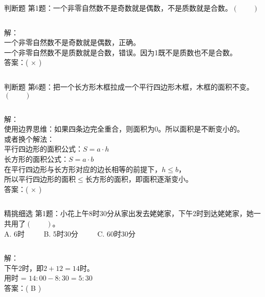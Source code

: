 \documentclass[aspectratio=169]{ctexbeamer} %
\begin{document}
\begin{frame}[t]{判断题}
第1题：一个非零自然数不是奇数就是偶数，不是质数就是合数。$(\qquad)$
\pause
\vspace{1em}
\begin{columns}
\vspace{1em}
解：\\
一个非零自然数不是奇数就是偶数，正确。\\
一个非零自然数不是质数就是合数，错误。因为1既不是质数也不是合数。 \\
\vspace{1em}
答案：\alert{( $ \times $ )}
\end{columns}
\end{frame}

\begin{frame}[t]{判断题}
第6题：把一个长方形木框拉成一个平行四边形木框，木框的面积不变。$(\qquad)$
\pause
\vspace{1em}
\begin{columns}
\vspace{1em}
解：\\
使用边界思维：如果四条边完全重合，则面积为\alert{0}。所以面积是不断变小的。\\
\vspace{1em}
或者换个解法：\\
平行四边形的面积公式：\alert{$S = a \cdot h$ }\\
长方形的面积公式：\alert{$S = a \cdot b$} \\
在平行四边形与长方形对应的边长相等的前提下，\alert{$h \le b$}，\\
所以平行四边形的面积\alert{$\le$}长方形的面积，即面积逐渐变小。\\
\vspace{1em}
答案：\alert{( $ \times $ )}
\end{columns}
\end{frame}

\begin{frame}[t]{精挑细选}
第1题：小花上午8时30分从家出发去姥姥家，下午2时到达姥姥家，她一共用了$(\qquad)$。\\
A. 6时 $\qquad$ B. 5时30分 $\qquad$ C. 60时30分 \\
\pause
\vspace{1em}
\begin{columns}
\vspace{1em}
解：\\
下午2时，即$2 + 12 = 14$时。\\
用时 = $14:00 - 8:30 = 5:30$ \\
\vspace{1em}
答案：\alert{( B )}
\end{columns}
\end{frame}
\end{document}
